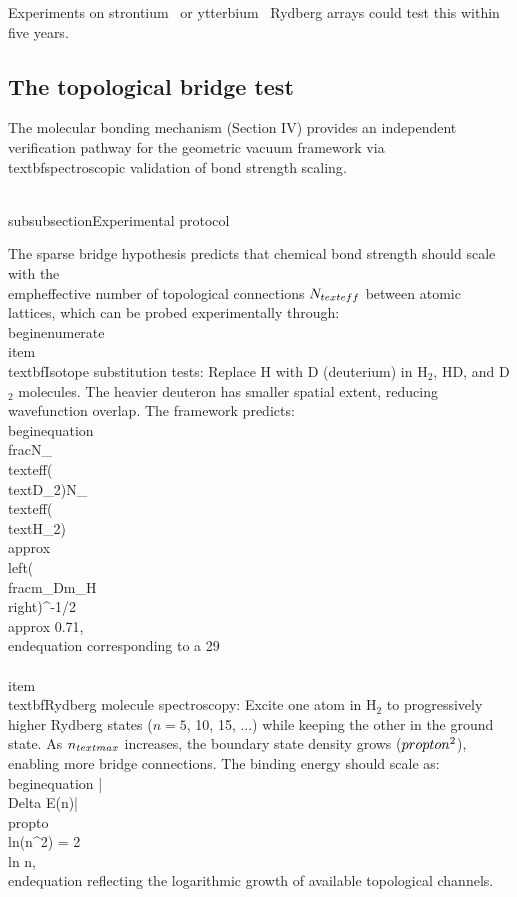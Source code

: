 \documentclass[aps,prd,twocolumn,superscriptaddress,groupedaddress,showpacs]{revtex4-2}
\begin{document}
Experiments on strontium~\cite{Madjarov2020} or ytterbium~\cite{Graham2022} Rydberg arrays could test this within five years.

\subsection{The topological bridge test}

The molecular bonding mechanism (Section IV) provides an independent verification pathway for the geometric vacuum framework via \\textbf{spectroscopic validation of bond strength scaling}.

\\subsubsection{Experimental protocol}

The sparse bridge hypothesis predicts that chemical bond strength should scale with the \\emph{effective number of topological connections} $N_{\\text{eff}}$ between atomic lattices, which can be probed experimentally through:
\\begin{enumerate}
\\item \\textbf{Isotope substitution tests}: Replace H with D (deuterium) in H$_2$, HD, and D$_2$ molecules. The heavier deuteron has smaller spatial extent, reducing wavefunction overlap. The framework predicts:
\\begin{equation}
\\frac{N_{\\text{eff}}(\\text{D}_2)}{N_{\\text{eff}}(\\text{H}_2)} \\approx \\left(\\frac{m_D}{m_H}\\right)^{-1/2} \\approx 0.71,
\\end{equation}
corresponding to a 29\\%

\\item \\textbf{Rydberg molecule spectroscopy}: Excite one atom in H$_2$ to progressively higher Rydberg states ($n=5$, 10, 15, ...) while keeping the other in the ground state. As $n_{\\text{max}}$ increases, the boundary state density grows ($\\propto n^2$), enabling more bridge connections. The binding energy should scale as:
\\begin{equation}
|\\Delta E(n)| \\propto \\ln(n^2) = 2\\ln n,
\\end{equation}
reflecting the logarithmic growth of available topological channels.
\end{document}
